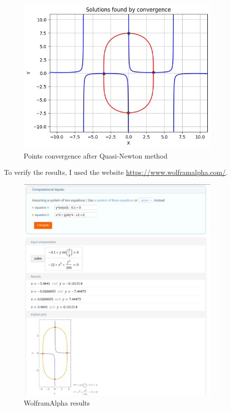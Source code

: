 \begin{figure}[H]
    \centering
    \includegraphics[width=10cm]{images/nlconvergence.png}
    \caption{Points convergence after Quasi-Newton method}
    \label{fig:nlconv}
\end{figure}

To verify the results, I used the website \url{https://www.wolframalpha.com/}.
\begin{figure}[H]
    \centering
    \includegraphics[width=10cm]{images/verifNonLinear.png}
    \caption{WolframAlpha results}
    \label{fig:wolframNonLinear}
\end{figure}